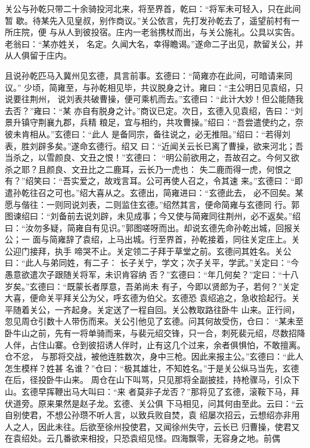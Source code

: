 关公与孙乾只带二十余骑投河北来，将至界首，乾曰：“将军未可轻入，只在此间暂
歇。待某先入见皇叔，别作商议。”关公依言，先打发孙乾去了，遥望前村有一所庄院，便
与从人到彼投宿。庄内一老翁携杖而出，与关公施礼。公具以实告。老翁曰：“某亦姓关，
名定。久闻大名，幸得瞻谒。”遂命二子出见，款留关公，并从人俱留于庄内。

且说孙乾匹马入冀州见玄德，具言前事。玄德曰：“简雍亦在此间，可暗请来同议。”
少顷，简雍至，与孙乾相见毕，共议脱身之计。雍曰：“主公明日见袁绍，只说要往荆州，
说刘表共破曹操，便可乘机而去。”玄德曰：“此计大妙！但公能随我去否？”雍曰：“某
亦自有脱身之计。”商议已定。次日，玄德入见袁绍，告曰：“刘景升镇守荆襄九郡，兵精
粮足，宜与相约，共攻曹操。”绍曰：“吾尝遣使约之，奈彼未肯相从。”玄德曰：“此人
是备同宗，备往说之，必无推阻。”绍曰：“若得刘表，胜刘辟多矣。”遂命玄德行。绍又
曰：“近闻关云长已离了曹操，欲来河北；吾当杀之，以雪颜良、文丑之恨！”玄德曰：
“明公前欲用之，吾故召之。今何又欲杀之耶？且颜良、文丑比之二鹿耳，云长乃一虎也：
失二鹿而得一虎，何恨之有？”绍笑曰：“吾实爱之，故戏言耳。公可再使人召之，令其速
来。”玄德曰：“即遣孙乾往召之可也。”绍大喜从之。玄德出，简雍进曰：“玄德此去，
必不回矣。某愿与偕往：一则同说刘表，二则监住玄德。”绍然其言，便命简雍与玄德同
行。郭图谏绍曰：“刘备前去说刘辟，未见成事；今又使与简雍同往荆州，必不返矣。”绍
曰：“汝勿多疑，简雍自有见识。”郭图嗟呀而出。却说玄德先命孙乾出城，回报关公；一
面与简雍辞了袁绍，上马出城。行至界首，孙乾接着，同往关定庄上。关公迎门接拜，执手
啼哭不止。关定领二子拜于草堂之前。玄德问其姓名。关公曰：“此人与弟同姓，有二子：
长子关宁，学文；次子关平，学武。”关定曰：“今愚意欲遣次子跟随关将军，未识肯容纳
否？”玄德曰：“年几何矣？”定曰：“十八岁矣。”玄德曰：“既蒙长者厚意，吾弟尚未
有子，今即以贤郎为子，若何？”关定大喜，便命关平拜关公为父，呼玄德为伯父。玄德恐
袁绍追之，急收拾起行。关平随着关公，一齐起身。关定送了一程自回。关公教取路往卧牛
山来。正行间，忽见周仓引数十人带伤而来。关公引他见了玄德。问其何故受伤，仓曰：
“某未至卧牛山之前，先有一将单骑而来，与裴元绍交锋，只一合，刺死裴元绍，尽数招降
人伴，占住山寨。仓到彼招诱人伴时，止有这几个过来，余者俱惧怕，不敢擅离。仓不忿，
与那将交战，被他连胜数次，身中三枪。因此来报主公。”玄德曰：“此人怎生模样？姓甚
名谁？”仓曰：“极其雄壮，不知姓名。”于是关公纵马当先，玄德在后，径投卧牛山来。
周仓在山下叫骂，只见那将全副披挂，持枪骤马，引众下山。玄德早挥鞭出马大叫曰：“来
者莫非子龙否？”那将见了玄德，滚鞍下马，拜伏道旁。原来果然是赵子龙。玄德、关公俱
下马相见，问其何由至此。云曰：“云自别使君，不想公孙瓒不听人言，以致兵败自焚，袁
绍屡次招云，云想绍亦非用人之人，因此未往。后欲至徐州投使君，又闻徐州失守，云长已
归曹操，使君又在袁绍处。云几番欲来相投，只恐袁绍见怪。四海飘零，无容身之地。前偶
